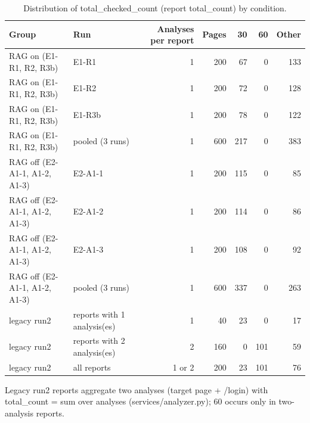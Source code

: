 \begin{table}[t]
\centering
\small
\caption{Distribution of total\_checked\_count (report total\_count) by condition.}
\label{tab:e7-tcc-cond}
\begin{tabular}{llrrrrr}
\toprule
Group & Run & Analyses per report & Pages & 30 & 60 & Other \\
\midrule
RAG on (E1-R1, R2, R3b) & E1-R1 & 1 & 200 & 67 & 0 & 133 \\
RAG on (E1-R1, R2, R3b) & E1-R2 & 1 & 200 & 72 & 0 & 128 \\
RAG on (E1-R1, R2, R3b) & E1-R3b & 1 & 200 & 78 & 0 & 122 \\
RAG on (E1-R1, R2, R3b) & pooled (3 runs) & 1 & 600 & 217 & 0 & 383 \\
RAG off (E2-A1-1, A1-2, A1-3) & E2-A1-1 & 1 & 200 & 115 & 0 & 85 \\
RAG off (E2-A1-1, A1-2, A1-3) & E2-A1-2 & 1 & 200 & 114 & 0 & 86 \\
RAG off (E2-A1-1, A1-2, A1-3) & E2-A1-3 & 1 & 200 & 108 & 0 & 92 \\
RAG off (E2-A1-1, A1-2, A1-3) & pooled (3 runs) & 1 & 600 & 337 & 0 & 263 \\
legacy run2 & reports with 1 analysis(es) & 1 & 40 & 23 & 0 & 17 \\
legacy run2 & reports with 2 analysis(es) & 2 & 160 & 0 & 101 & 59 \\
legacy run2 & all reports & 1 or 2 & 200 & 23 & 101 & 76 \\
\bottomrule
\end{tabular}
\par\footnotesize Legacy run2 reports aggregate two analyses (target page + /login) with total\_count = sum over analyses (services/analyzer.py); 60 occurs only in two-analysis reports.
\end{table}
